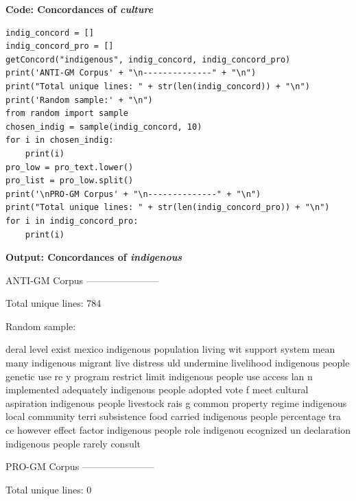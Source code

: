 \textbf{Code: Concordances of \textit{culture}}

\begin{lstlisting}
indig_concord = []
indig_concord_pro = []
getConcord("indigenous", indig_concord, indig_concord_pro)
print('ANTI-GM Corpus' + "\n--------------" + "\n")                     
print("Total unique lines: " + str(len(indig_concord)) + "\n")
print('Random sample:' + "\n") 
from random import sample
chosen_indig = sample(indig_concord, 10)
for i in chosen_indig:
    print(i)
pro_low = pro_text.lower()
pro_list = pro_low.split()
print('\nPRO-GM Corpus' + "\n--------------" + "\n")            
print("Total unique lines: " + str(len(indig_concord_pro)) + "\n")
for i in indig_concord_pro:
    print(i)
\end{lstlisting}

\textbf{Output: Concordances of \textit{indigenous}}

\begin{footnotesize}

ANTI-GM Corpus\newline
-----------------------

Total unique lines: 784

Random sample:

deral level exist mexico indigenous population living wit\newline
support system mean many indigenous migrant live distress\newline
uld undermine livelihood indigenous people genetic use re\newline
y program restrict limit indigenous people use access lan\newline
n implemented adequately indigenous people adopted vote f\newline
meet cultural aspiration indigenous people livestock rais\newline
g common property regime indigenous local community terri\newline
subsistence food carried indigenous people percentage tra\newline
ce however effect factor indigenous people role indigenou\newline
ecognized un declaration indigenous people rarely consult

PRO-GM Corpus\newline
-----------------------

Total unique lines: 0

\end{footnotesize}


